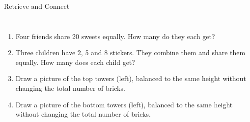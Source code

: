 \documentclass{beamer}
\newcommand{\ashow}[1]{\uncover<2->{\textcolor{red}{\small #1}}}
\newcommand{\ashowq}[1]{\alt<2->{\textcolor{red}{\small #1}}{?}}
\begin{document}
\begin{frame}{Retrieve and Connect}
\begin{columns}[T]
\footnotesize
\vspace{0.2em}
\begin{enumerate}\itemsep1pt
  \item Four friends share 20 sweets equally. How many do they each get? \ashow{5 sweets}
  \item Three children have 2, 5 and 8 stickers. They combine them and share them equally. How many does each child get? \ashow{5 stickers}
  \item Draw a picture of the top towers (left), balanced to the same height without changing the total number of bricks.
  \item Draw a picture of the bottom towers (left), balanced to the same height without changing the total number of bricks.
\end{enumerate}

\end{columns}
\end{frame}
\end{document}
